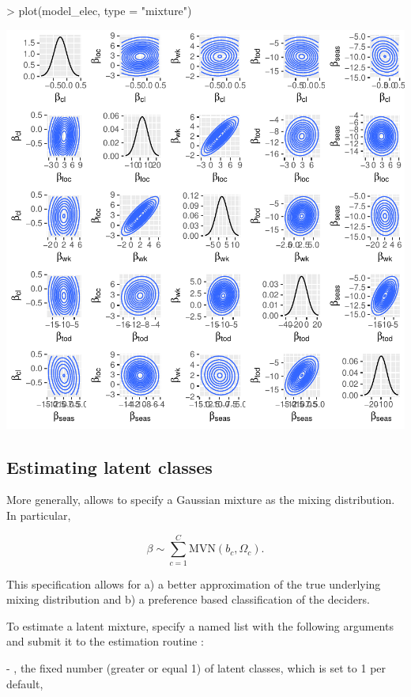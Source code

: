 \documentclass[article]{jss}
\newcommand{\fct}[1]{\code{#1()}}
\begin{document}
\begin{Schunk}
\begin{Sinput}
> plot(model_elec, type = "mixture")
\end{Sinput}
\end{Schunk}
\includegraphics{rprobitb_oelschlaeger_bauer-plot-mixture-model-elec}

\subsection{Estimating latent classes} \label{subsec:latent_classes}

More generally,  allows to specify a Gaussian mixture as the mixing distribution. In particular,

$$ \beta \sim \sum_{c=1}^C \text{MVN} (b_c,\Omega_c).$$

This specification allows for a) a better approximation of the true underlying mixing distribution and b) a preference based classification of the deciders.

To estimate a latent mixture, specify a named list  with the following arguments and submit it to the estimation routine \fct{mcmc}:

- , the fixed number (greater or equal 1) of latent classes, which is set to 1 per default,
\end{document}
